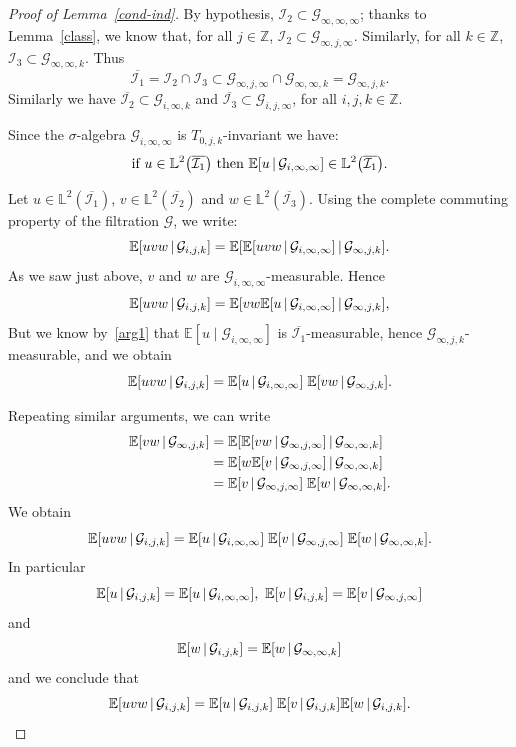 \documentclass[AHL,Unicode,longabstracts,published]{cedram}
\newcommand{\Z}{\mathbb{Z}}
\newcommand*\bbL{\mathbb{L}}
\newcommand{\bbE}{\mathbb{E}}
\newcommand{\E}[1]{\bbE\left[#1\right]}
\newcommand*\I{\mathcal{I}}
\newcommand*\G{\mathcal{G}}
\let\originalleft\left
\let\originalright\right
\renewcommand{\left}{\mathopen{}\mathclose\bgroup\originalleft}
\renewcommand{\right}{\aftergroup\egroup\originalright}
\begin{document}
\begin{proof}[Proof of Lemma~\ref{cond-ind}]
By hypothesis, $\I_2\subset\G_{\infty,\infty,\infty}$; thanks to Lemma~\ref{class}, we know that, for all $j\in\Z$, $\I_2\subset\G_{\infty,j,\infty}$. Similarly, for all $k\in\Z$, $\I_3\subset\G_{\infty,\infty,k}$. Thus
\[
\overline{\I_1}=\I_2\cap\I_3\subset\G_{\infty,j,\infty}\cap\G_{\infty,\infty,k}=\G_{\infty,j,k}.
\]
Similarly we have $\overline{\I_2}\subset\G_{i,\infty,k}$ and $\overline{\I_3}\subset\G_{i,j,\infty}$, for all $i,j,k\in\Z$.

Since the $\sigma$-algebra $\G_{i,\infty,\infty}$ is $T_{0,j,k}$-invariant we have:
\begin{equation}\label{arg1}
\text{if }u\in \bbL^2\left(\overline{\I_1}\right) \text{ then } \E{u\,\middle|\,\G_{i,\infty,\infty}}\in \bbL^2\left(\overline{\I_1}\right).
\end{equation}

Let $u\in \bbL^2(\overline{\I_1})$, $v\in \bbL^2(\overline{\I_2})$ and $w\in \bbL^2(\overline{\I_3})$. Using the complete commuting property of the filtration $\G$, we write:
\[
\E{uvw\,\middle|\,\G_{i,j,k}}=\bbE\left[\E{uvw\,\middle|\,\G_{i,\infty,\infty}}\,\middle|\,\G_{\infty,j,k}\right].
\]
As we saw just above, $v$ and $w$ are $\G_{i,\infty,\infty}$-measurable. Hence
\[
\E{uvw\,\middle|\,\G_{i,j,k}}=\bbE\left[vw\E{u\,\middle|\,\G_{i,\infty,\infty}}\,\middle|\,\G_{\infty,j,k}\right],
\]
But we know by~\eqref{arg1} that $\bbE[u\mid\G_{i,\infty,\infty}]$ is $\overline{\I_1}$-measurable, hence $\G_{\infty,j,k}$-measurable, and we obtain
\begin{equation*}\label{arg2}
\E{uvw\,\middle|\,\G_{i,j,k}}=\E{u\,\middle|\,\G_{i,\infty,\infty}}\;\E{vw\,\middle|\,\G_{\infty,j,k}}.
\end{equation*}

Repeating similar arguments, we can write
\begin{align*}
\E{vw\,\middle|\,\G_{\infty,j,k}}
&=\bbE\left[\E{vw\,\middle|\,\G_{\infty,j,\infty}}\,\middle|\,\G_{\infty,\infty,k}\right]\\
&=\bbE\left[w\E{v\,\middle|\,\G_{\infty,j,\infty}}\,\middle|\,\G_{\infty,\infty,k}\right]\\
&=\E{v\,\middle|\,\G_{\infty,j,\infty}}\;\E{w\,\middle|\,\G_{\infty,\infty,k}}.
\end{align*}
We obtain
\[
\E{uvw\,\middle|\,\G_{i,j,k}}=\E{u\,\middle|\,\G_{i,\infty,\infty}}\;\E{v\,\middle|\,\G_{\infty,j,\infty}}\;\E{w\,\middle|\,\G_{\infty,\infty,k}}.
\]
In particular
\[
\E{u\,\middle|\,\G_{i,j,k}}=\E{u\,\middle|\,\G_{i,\infty,\infty}},\
\E{v\,\middle|\,\G_{i,j,k}}=\E{v\,\middle|\,\G_{\infty,j,\infty}}
\]
and
\[
\E{w\,\middle|\,\G_{i,j,k}}=\E{w\,\middle|\,\G_{\infty,\infty,k}}
\]
and we conclude that
\[
\E{uvw\,\middle|\,\G_{i,j,k}}=\E{u\,\middle|\,\G_{i,j,k}}\;\E{v\,\middle|\,\G_{i,j,k}}\E{w\,\middle|\,\G_{i,j,k}}.\qedhere
\]
\end{proof}
\end{document}
